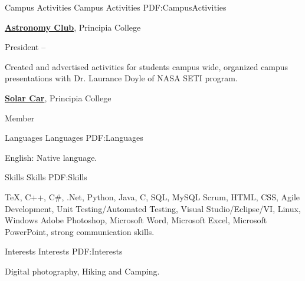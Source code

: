\documentclass[a4paper,MMMyyyy,nonstopmode]{simpleresumecv}
\begin{document}
\begin{Body}




\Section
{Campus Activities}
{Campus Activities}
{PDF:CampusActivities}

\Entry
\href{http://www.example.com/my-club}
{\textbf{Astronomy Club}},
Principia College

\Gap
\BulletItem
President
\hfill
{} --
\begin{Detail}
\SubBulletItem
Created and advertised activities for students campus wide, organized campus presentations with Dr. Laurance Doyle of NASA SETI program.

\Entry
\Gap
\href{https://www.principiasolarcar.com/}
{\textbf{Solar Car}},
Principia College

\BulletItem
Member
\end{Detail}


\Section
{Languages}
{Languages}
{PDF:Languages}

\BulletItem
English: Native language.


\Section
{Skills}
{Skills}
{PDF:Skills}

\Entry
{\TeX},
C++,
C\#,
.Net,
Python,
Java,
C,
SQL, MySQL
Scrum,
HTML, CSS,
Agile Development,
Unit Testing/Automated Testing,
Visual Studio/Eclipse/VI,
Linux, Windows
Adobe Photoshop,
Microsoft Word,
Microsoft Excel,
Microsoft PowerPoint,
strong communication skills.


\Section
{Interests}
{Interests}
{PDF:Interests}

\Entry
Digital photography,
Hiking and Camping.



\end{Body}
\end{document}
